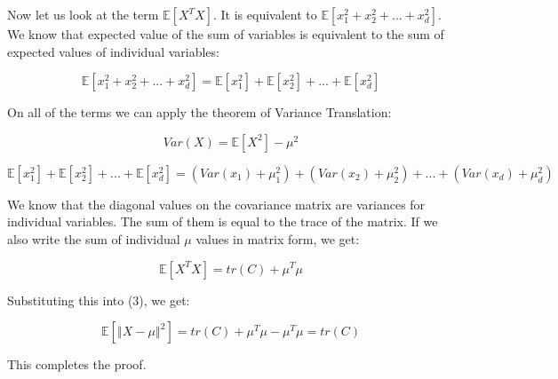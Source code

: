 \documentclass[10pt,letterpaper]{article}
\begin{document}
Now let us look at the term $\mathbb{E}[X^TX]$. It is equivalent to $\mathbb{E}[x_1^2 + x_2^2 + ... + x_d^2]$. We know that expected value of the sum of variables is equivalent to the sum of expected values of individual variables: 

    \begin{equation}
       \mathbb{E}[x_1^2 + x_2^2 + ... + x_d^2] = 
       \mathbb{E}[x_1^2] + \mathbb{E}[x_2^2] + ... + \mathbb{E}[x_d^2]
    \end{equation}

On all of the terms we can apply the theorem of Variance Translation: 

    \begin{equation}
       Var(X) =  \mathbb{E}[X^2] - \mu^2
    \end{equation}

    \begin{equation}
       \mathbb{E}[x_1^2] + \mathbb{E}[x_2^2] + ... + \mathbb{E}[x_d^2] = (Var(x_1) + \mu_1^2) + (Var(x_2) + \mu_2^2) + ... + (Var(x_d) + \mu_d^2)
    \end{equation}

We know that the diagonal values on the covariance matrix are variances for individual variables. The sum of them is equal to the trace of the matrix. If we also write the sum of individual $\mu$ values in matrix form, we get: 

    \begin{equation}
       \mathbb{E}[X^TX] = tr(C) + \mu^T\mu
    \end{equation}

Substituting this into (3), we get:

    \begin{equation}
       \mathbb{E}[\left \Vert X-\mu \right \Vert ^2] = 
       tr(C) + \mu^T\mu- \mu^T\mu = tr(C)
    \end{equation}

This completes the proof. 
\end{document}
